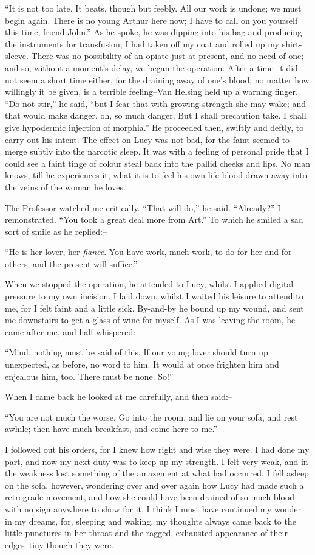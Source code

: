 \documentclass[12pt,openright]{book}
\begin{document}
“It is not too late. It beats, though but feebly. All our work is undone; we must begin again. There is no young Arthur here now; I have to call on you yourself this time, friend John.” As he spoke, he was dipping into his bag and producing the instruments for transfusion; I had taken off my coat and rolled up my shirt-sleeve. There was no possibility of an opiate just at present, and no need of one; and so, without a moment’s delay, we began the operation. After a time–it did not seem a short time either, for the draining away of one’s blood, no matter how willingly it be given, is a terrible feeling–Van Helsing held up a warning finger. “Do not stir,” he said, “but I fear that with growing strength she may wake; and that would make danger, oh, so much danger. But I shall precaution take. I shall give hypodermic injection of morphia.” He proceeded then, swiftly and deftly, to carry out his intent. The effect on Lucy was not bad, for the faint seemed to merge subtly into the narcotic sleep. It was with a feeling of personal pride that I could see a faint tinge of colour steal back into the pallid cheeks and lips. No man knows, till he experiences it, what it is to feel his own life-blood drawn away into the veins of the woman he loves.

The Professor watched me critically. “That will do,” he said. “Already?” I remonstrated. “You took a great deal more from Art.” To which he smiled a sad sort of smile as he replied:–

“He is her lover, her \textit{fiancé}. You have work, much work, to do for her and for others; and the present will suffice.”

When we stopped the operation, he attended to Lucy, whilst I applied digital pressure to my own incision. I laid down, whilst I waited his leisure to attend to me, for I felt faint and a little sick. By-and-by he bound up my wound, and sent me downstairs to get a glass of wine for myself. As I was leaving the room, he came after me, and half whispered:–

“Mind, nothing must be said of this. If our young lover should turn up unexpected, as before, no word to him. It would at once frighten him and enjealous him, too. There must be none. So!”

When I came back he looked at me carefully, and then said:–

“You are not much the worse. Go into the room, and lie on your sofa, and rest awhile; then have much breakfast, and come here to me.”

I followed out his orders, for I knew how right and wise they were. I had done my part, and now my next duty was to keep up my strength. I felt very weak, and in the weakness lost something of the amazement at what had occurred. I fell asleep on the sofa, however, wondering over and over again how Lucy had made such a retrograde movement, and how she could have been drained of so much blood with no sign anywhere to show for it. I think I must have continued my wonder in my dreams, for, sleeping and waking, my thoughts always came back to the little punctures in her throat and the ragged, exhausted appearance of their edges–tiny though they were.
\end{document}
